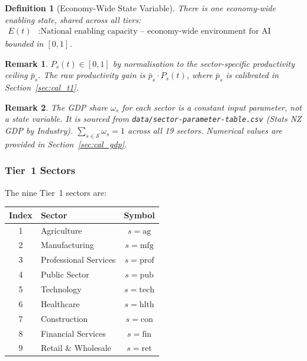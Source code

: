 \documentclass[11pt,a4paper]{article}
\newtheorem{definition}{Definition}
\newtheorem{remark}{Remark}
\begin{document}
\begin{definition}[Economy-Wide State Variable]
There is one economy-wide enabling state, shared across all tiers:
\begin{align}
E(t) &: \text{National enabling capacity -- economy-wide environment for AI adoption}
\end{align}
bounded in $[0,1]$.
\end{definition}

\begin{remark}
$P_s(t) \in [0,1]$ by normalisation to the sector-specific productivity ceiling $\bar{p}_s$. The raw productivity gain is $\bar{p}_s \cdot P_s(t)$, where $\bar{p}_s$ is calibrated in Section~\ref{sec:cal_t1}.
\end{remark}

\begin{remark}
The GDP share $\omega_s$ for each sector is a constant input parameter, not a state variable. It is sourced from \texttt{data/sector-parameter-table.csv} (Stats NZ GDP by Industry). $\sum_{s \in \mathcal{S}} \omega_s = 1$ across all 19 sectors. Numerical values are provided in Section~\ref{sec:cal_gdp}.
\end{remark}

\subsubsection*{Tier~1 Sectors}

The nine Tier~1 sectors are:

\begin{center}
\begin{tabular}{clc}
\toprule
Index & Sector & Symbol \\
\midrule
1 & Agriculture & $s = \text{ag}$ \\
2 & Manufacturing & $s = \text{mfg}$ \\
3 & Professional Services & $s = \text{prof}$ \\
4 & Public Sector & $s = \text{pub}$ \\
5 & Technology & $s = \text{tech}$ \\
6 & Healthcare & $s = \text{hlth}$ \\
7 & Construction & $s = \text{con}$ \\
8 & Financial Services & $s = \text{fin}$ \\
9 & Retail \& Wholesale & $s = \text{ret}$ \\
\bottomrule
\end{tabular}
\end{center}
\end{document}
